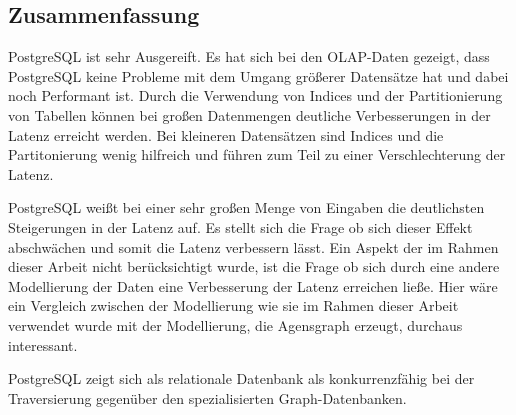 \subsection{Zusammenfassung}
PostgreSQL ist sehr Ausgereift. Es hat sich bei den OLAP-Daten gezeigt, dass PostgreSQL keine Probleme mit dem Umgang größerer Datensätze hat und dabei noch Performant ist. Durch die Verwendung von Indices und der Partitionierung von Tabellen können bei großen Datenmengen deutliche Verbesserungen in der Latenz erreicht werden. Bei kleineren Datensätzen sind Indices und die Partitonierung wenig hilfreich und führen zum Teil zu einer Verschlechterung der Latenz.

PostgreSQL weißt bei einer sehr großen Menge von Eingaben die deutlichsten Steigerungen in der Latenz auf. Es stellt sich die Frage ob sich dieser Effekt abschwächen und somit die Latenz verbessern lässt.
Ein Aspekt der im Rahmen dieser Arbeit nicht berücksichtigt wurde, ist die Frage ob sich durch eine andere Modellierung der Daten eine Verbesserung der Latenz erreichen ließe. Hier wäre ein Vergleich zwischen der Modellierung wie sie im Rahmen dieser Arbeit verwendet wurde mit der Modellierung, die Agensgraph erzeugt, durchaus interessant. 

PostgreSQL zeigt sich als relationale Datenbank als konkurrenzfähig bei der Traversierung gegenüber den spezialisierten Graph-Datenbanken.

